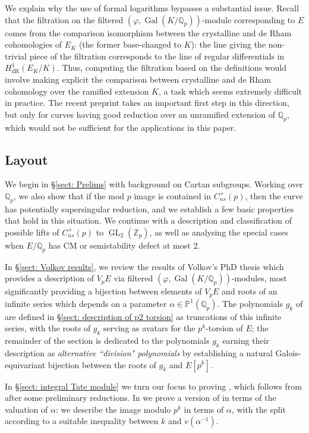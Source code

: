 \documentclass{amsart}
\newcommand{\op}[1]{\operatorname{#1}}
\newcommand{\Qp}{\mathbb{Q}_p}
\theoremstyle{definition}
\newcommand{\Z}{\mathbb{Z}}
\newcommand{\Q}{\mathbb{Q}}
\numberwithin{theorem}{section}
\numberwithin{equation}{section}
\begin{document}
We explain why the use of formal logarithms bypasses a substantial issue. Recall that the filtration on the filtered $(\varphi, \op{Gal}(K/\Q_p))$-module corresponding to $E$ comes from the comparison isomorphism between the crystalline and de Rham cohomologies of $E_K$ (the former base-changed to $K$): the line giving the non-trivial piece of the filtration corresponds to the line of regular differentials in $H^1_{\operatorname{dR}}(E_K/K)$. Thus, computing the filtration based on the definitions would involve making explicit the comparison between crystalline and de Rham cohomology over the ramified extension $K$, a task which seems extremely difficult in practice. The recent preprint \cite{booher2026computingcrystallinecohomologypdivisible} takes an important first step in this direction, but only for curves having good reduction over an unramified extension of $\Q_p$, which would not be sufficient for the applications in this paper.

\subsection{Layout}
We begin in \S\ref{sect: Prelims} with background on Cartan subgroups. Working over $\Q_p$, we also show that if the mod $p$ image is contained in $C_{ns}^+(p)$, then the curve has potentially supersingular reduction, and we establish a few basic properties that hold in this situation. We continue with a description and classification of possible lifts of $C_{ns}^+(p)$ to $\op{GL}_2(\Z_p)$, as well as analysing the special cases when $E/\Qp$ has CM or semistability defect at most $2$.

In \S\ref{sect: Volkov results}, we review the results of Volkov's PhD thesis which provides a description of $V_pE$ via filtered $(\varphi,\op{Gal}(K/\Qp))$-modules, most significantly providing a bijection between elements of $V_pE$ and roots of an infinite series which depends on a parameter $\alpha \in \mathbb{P}^1(\Qp)$. The polynomials $g_k$ of  are defined in \S\ref{sect: description of p2 torsion} as truncations of this infinite series, with the roots of $g_k$ serving as avatars for the $p^k$-torsion of $E$; the remainder of the section is dedicated to the polynomials $g_k$ earning their description as \textit{alternative ``division" polynomials} by establishing a natural Galois-equivariant bijection between the roots of $g_k$ and $E[p^k]$.

In \S\ref{sect: integral Tate module} we turn our focus to proving , which follows from  after some preliminary reductions. In  we prove a version of  in terms of the valuation of $\alpha$: we describe the image modulo $p^k$ in terms of $\alpha$, with the split according to a suitable inequality between $k$ and $v(\alpha^{-1})$.
\end{document}
